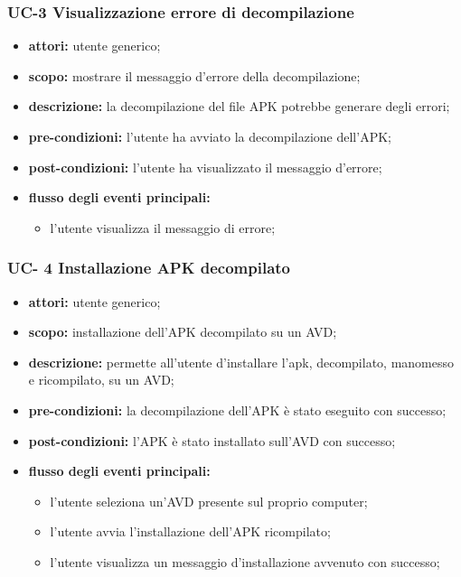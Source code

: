 \subsubsection{UC-3 Visualizzazione errore di decompilazione}\label{subsubsec:uc-3-visualizzazione-errore-di-decompilazione}
\begin{itemize}
    \item \textbf{attori:} utente generico;
    \item \textbf{scopo:} mostrare il messaggio d'errore della decompilazione;
    \item \textbf{descrizione:} la decompilazione del file APK potrebbe generare degli errori;
    \item \textbf{pre-condizioni:} l'utente ha avviato la decompilazione dell'APK;
    \item \textbf{post-condizioni:} l'utente ha visualizzato il messaggio d'errore;
    \item \textbf{flusso degli eventi principali:}
    \begin{itemize}
        \item l'utente visualizza il messaggio di errore;
    \end{itemize}
\end{itemize}
\subsubsection{UC- 4 Installazione APK decompilato}\label{subsubsec:uc--4-installazione-APK-decompilato}
\begin{itemize}
    \item \textbf{attori:} utente generico;
    \item \textbf{scopo:} installazione dell'APK decompilato su un AVD;
    \item \textbf{descrizione:} permette all'utente d'installare l'apk, decompilato, manomesso e ricompilato, su un AVD;
    \item \textbf{pre-condizioni:} la decompilazione dell'APK è stato eseguito con successo;
    \item \textbf{post-condizioni:} l'APK è stato installato sull'AVD con successo;
    \item \textbf{flusso degli eventi principali:}
    \begin{itemize}
        \item l'utente seleziona un'AVD presente sul proprio computer;
        \item l'utente avvia l'installazione dell'APK ricompilato;
        \item l'utente visualizza un messaggio d'installazione avvenuto con successo;
    \end{itemize}
\end{itemize}
